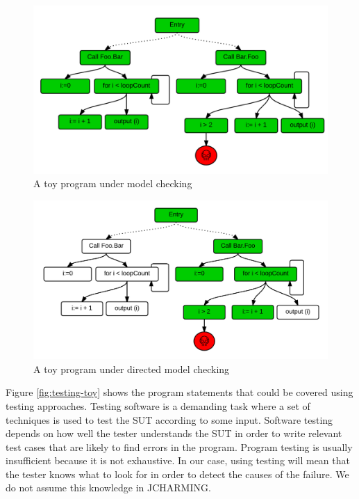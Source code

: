\documentclass[times, doublespace]{smrauth}
\begin{document}
\begin{figure}
  \centering
    \includegraphics[scale=0.7]{media/mc.png}
    \caption{A toy program under model checking
    \label{fig:checking-toy}}
\end{figure}

\begin{figure}
  \centering
    \includegraphics[scale=0.7]{media/dmc.png}
    \caption{A toy program under directed model checking
    \label{fig:dchecking-toy}}
\end{figure}

Figure \ref{fig:testing-toy} shows the program statements that could be covered using testing approaches. Testing software is a demanding task where a set of techniques is used to test the SUT according to some input. Software testing depends on how well the tester understands the SUT in order to write relevant test cases that are likely to find errors in the program. Program testing is usually insufficient because it is not exhaustive. In our case, using testing will mean that the tester knows what to look for in order to detect the causes of the failure. We do not assume this knowledge in JCHARMING.
\end{document}
